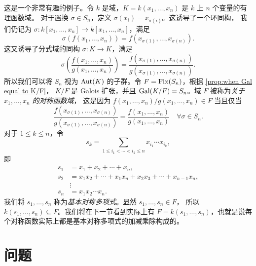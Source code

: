 \begin{example}\label{exa:symmetric function}
  这是一个非常有趣的例子。令 $k$ 是域，$K=k(x_1,\dots,x_n)$ 是 $k$ 上 $n$ 个变量的有理函数域。
  对于置换 $\sigma\in S_n$，定义 $\sigma(x_i)=x_{\sigma(i)}$。这诱导了一个环同构，
  我们仍记为 $\sigma:k[x_1,\dots,x_n]\to k[x_1,\dots,x_n]$，满足
  \[
    \sigma(f(x_1,\dots,x_n))  =f(x_{\sigma(1)},\dots,x_{\sigma(n)}).
  \]
  这又诱导了分式域的同构 $\sigma:K\to K$，满足
  \[
    \sigma\left(\frac{f(x_1,\dots,x_n)}{g(x_1,\dots,x_n)}\right) =
    \frac{f(x_{\sigma(1)},\dots,x_{\sigma(n)})}{g(x_{\sigma(1)},\dots,x_{\sigma(n)})}.
  \]
  所以我们可以将 $S_n$ 视为 $\operatorname{Aut}(K)$ 的子群。令 $F=\operatorname{Fix}(S_n)$，根据 \autoref{prop:when Gal equal to K/F}，
  $K/F$ 是 Galois 扩张，并且 $\operatorname{Gal}(K/F)=S_n$。域 $F$ 被称为\emph{关于 $x_1,\dots,x_n$ 的对称函数域}，
  这是因为 $f(x_1,\dots,x_n)/g(x_1,\dots,x_n)\in F$ 当且仅当
  \[
    \frac{f(x_{\sigma(1)},\dots,x_{\sigma(n)})}{g(x_{\sigma(1)},\dots,x_{\sigma(n)})}=
    \frac{f(x_1,\dots,x_n)}{g(x_1,\dots,x_n)}\quad \forall\sigma\in S_n.
  \]
  对于 $1\leq k\leq n$，令
  \[
    s_k=\sum_{1\leq i_1<\cdots<i_k\leq n} x_{i_1}\cdots x_{i_k}, 
  \]
  即
  \begin{align*}
    s_1&=x_1+x_2+\cdots+x_n,\\
    s_2&=x_1x_2+\cdots+x_1x_n+x_2x_3+\cdots+x_{n-1}x_n,\\
    &\vdots\\
    s_n&= x_1x_2\cdots x_n.
  \end{align*}
  我们将 $s_1,\dots,s_n$ 称为\emph{基本对称多项式}。显然 $s_1,\dots,s_n\in F$，
  所以 $k(s_1,\dots,s_n)\subseteq F$。我们将在下一节看到实际上有
  $F=k(s_1,\dots,s_n)$，也就是说每个对称函数实际上都是基本对称多项式的加减乘除构成的。
\end{example}

\section*{问题}

\setcounter{problem}{0}

